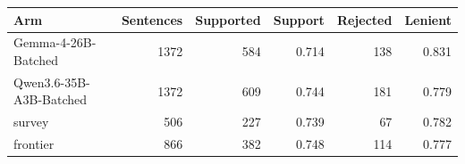 \begin{tabular}{lrrrrr}
\toprule
Arm & Sentences & Supported & Support & Rejected & Lenient \\
\midrule
Gemma-4-26B-Batched & 1372 & 584 & 0.714 & 138 & 0.831 \\
Qwen3.6-35B-A3B-Batched & 1372 & 609 & 0.744 & 181 & 0.779 \\
survey & 506 & 227 & 0.739 & 67 & 0.782 \\
frontier & 866 & 382 & 0.748 & 114 & 0.777 \\
\bottomrule
\end{tabular}
